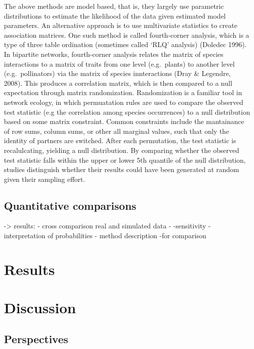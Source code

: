 The above methods are model based, that is, they largely use parametric
distributions to estimate the likelihood of the data given estimated model
parameters. An alternative approach is to use multivariate statistics to create
association matrices. One such method is called fourth-corner analysis, which is
a type of three table ordination (sometimes called `RLQ' analysis) (Doledec
1996). In bipartite networks, fourth-corner analysis relates the matrix of
species interactions to a matrix of traits from one level (e.g.~plants) to
another level (e.g.~pollinators) via the matrix of species innteractions (Dray \&
Legendre, 2008). This produces a correlation matrix, which is then compared to a
null expectation through matrix randomization. Randomization is a familiar tool
in network ecology, in which permuatation rules are used to compare the observed
test statistic (e.g the correlation among species occurrences) to a null
distribution based on some matrix constraint. Common constraints include the
mantainance of row sums, column sums, or other all marginal values, such that
only the identity of partners are switched. After each permutation, the test
statistic is recalulcating, yielding a null distribution. By comparing whether
the observed test statistic falls within the upper or lower 5th quantile of the
null distribution, studies distinguish whether their results could have been
generated at random given their sampling effort.

\subsection*{Quantitative comparisons}\label{quantitative-comparisons}

-\textgreater{} results: - cross comparison \textbar{} real and simulated data -
-sensitivity \textbar{} - interpretation of probabilities - method description
-for comparison

\section*{Results}\label{results}

\section*{Discussion}\label{discussion}

\subsection*{Perspectives}\label{perspectives}

